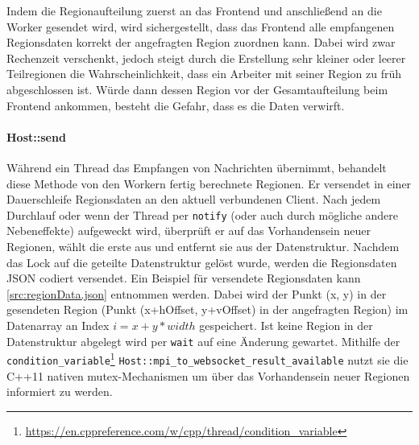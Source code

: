 Indem die Regionaufteilung zuerst an das Frontend und anschließend an die Worker gesendet wird,
wird sichergestellt, dass das Frontend alle empfangenen Regionsdaten korrekt der angefragten Region zuordnen kann.
Dabei wird zwar Rechenzeit verschenkt, jedoch steigt durch die Erstellung sehr kleiner oder leerer Teilregionen
die Wahrscheinlichkeit, dass ein Arbeiter mit seiner Region zu früh abgeschlossen ist.
Würde dann dessen Region vor der Gesamtaufteilung beim Frontend ankommen, besteht die Gefahr,
dass es die Daten verwirft.

\begin{figure}
	
\end{figure}

\begin{figure}
	
\end{figure}

\paragraph{Host::send}\label{cls:Host::send}

Während ein Thread das Empfangen von Nachrichten übernimmt, behandelt diese Methode von den Workern fertig berechnete Regionen.
Er versendet in einer Dauerschleife Regionsdaten an den aktuell verbundenen Client.
Nach jedem Durchlauf oder wenn der Thread per \verb|notify| (oder auch durch mögliche andere Nebeneffekte) aufgeweckt wird,
überprüft er auf das Vorhandensein neuer Regionen, wählt die erste aus und entfernt sie aus der Datenstruktur.
Nachdem das Lock auf die geteilte Datenstruktur gelöst wurde, werden die Regionsdaten JSON codiert versendet.
Ein Beispiel für versendete Regionsdaten kann \autoref{src:regionData.json} entnommen werden.
Dabei wird der Punkt (x, y) in der gesendeten Region (Punkt (x+hOffset, y+vOffset) in der angefragten Region)
im Datenarray an Index $i = x + y * width$ gespeichert.
Ist keine Region in der Datenstruktur abgelegt wird per \verb|wait| auf eine Änderung gewartet.
Mithilfe der \verb|condition_variable|\footnote{\url{https://en.cppreference.com/w/cpp/thread/condition_variable}} \verb|Host::mpi_to_websocket_result_available|
nutzt sie die C++11 nativen mutex-Mechanismen um über das Vorhandensein neuer Regionen informiert zu werden.

